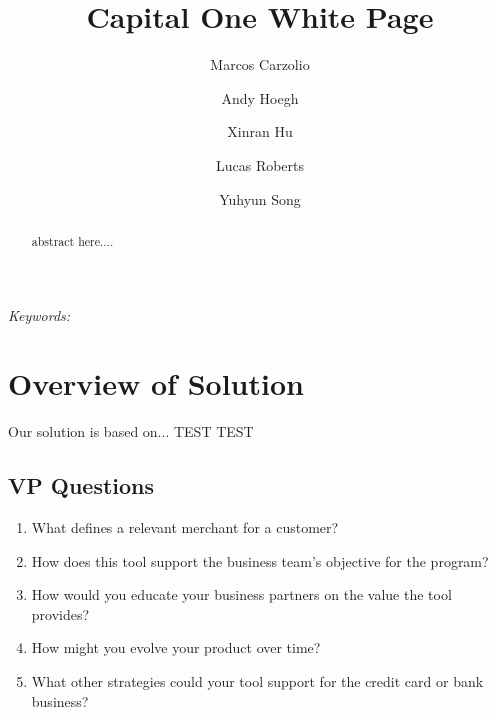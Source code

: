 \documentclass[12pt]{article} %
\begin{document}
\def\spacingset#1{\renewcommand{\baselinestretch}%
{#1}\small\normalsize} \spacingset{1}




  \title{\bf Capital One White Page}
  \author[1]{Marcos Carzolio}
  \author[1]{Andy Hoegh}
  \author[1]{Xinran Hu}
  \author[1]{Lucas Roberts}
  \author[1]{Yuhyun Song}
 \maketitle

\bigskip
\begin{abstract}
\noindent
abstract here....
\end{abstract}

\noindent%
{\it Keywords:} 
\vfill

\newpage


\newcommand{\ac}[1]{[{\color{red}\ Andy Says: {\tt #1}}]}
\newcommand{\xc}[1]{[{\color{red}\ Xinran Says: {\tt #1}}]}
\newcommand{\lc}[1]{[{\color{red}\ Lucas Says: {\tt #1}}]}
\newcommand{\mc}[1]{[{\color{red}\ Marcos Says: {\tt #1}}]}
\newcommand{\yc}[1]{[{\color{red}\ Yuhyun Says: {\tt #1}}]}

\section{Overview of Solution} 
Our solution is based on...  TEST TEST
\subsection{VP Questions}
\begin{enumerate}
\item What defines a relevant merchant for a customer?
\item How does this tool support the business team's objective for the program?
\item How would you educate your business partners on the value the tool provides?
\item How might you evolve your product over time?
\item What other strategies could your tool support for the credit card or bank business?
\end{enumerate}
\end{document}
